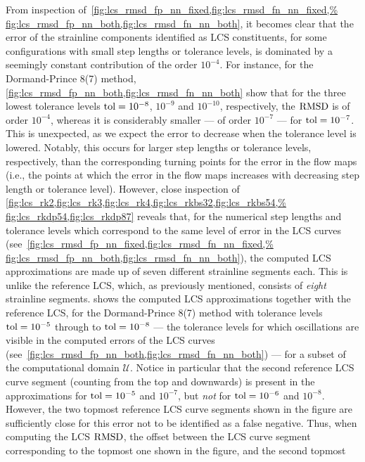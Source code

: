 From inspection of~\cref{fig:lcs_rmsd_fp_nn_fixed,fig:lcs_rmsd_fn_nn_fixed,%
fig:lcs_rmsd_fp_nn_both,fig:lcs_rmsd_fn_nn_both}, it becomes clear that the
error of the strainline components identified as LCS constituents, for some
configurations with small step lengths or tolerance levels, is dominated by
a seemingly constant contribution of the order $10^{-4}$. For instance,
for the Dormand-Prince 8(7) method,
\cref{fig:lcs_rmsd_fp_nn_both,fig:lcs_rmsd_fn_nn_both} show that for the three
lowest tolerance levels $\textnormal{tol}=10^{-8}$, $10^{-9}$ and
$10^{-10}$, respectively, the $\operatorname{RMSD}$ is of order $10^{-4}$, whereas it is
considerably smaller --- of order $10^{-7}$ --- for $\textnormal{tol}=10^{-7}$.
This is unexpected, as we expect the error to decrease when the tolerance level
is lowered.  Notably, this occurs for larger step lengths or tolerance levels,
respectively, than the corresponding turning points for the error in the flow
maps (i.e., the points at which the error in the flow maps increases with
decreasing step length or tolerance level). However, close inspection of
\cref{fig:lcs_rk2,fig:lcs_rk3,fig:lcs_rk4,fig:lcs_rkbs32,fig:lcs_rkbs54,%
fig:lcs_rkdp54,fig:lcs_rkdp87} reveals that, for the numerical step lengths
and tolerance levels which correspond to the same level of error in the LCS
curves (see~\cref{fig:lcs_rmsd_fp_nn_fixed,fig:lcs_rmsd_fn_nn_fixed,%
fig:lcs_rmsd_fp_nn_both,fig:lcs_rmsd_fn_nn_both}), the computed LCS
approximations are made up of seven different strainline segments each. This
is unlike the reference LCS, which, as previously mentioned, consists
of \emph{eight} strainline segments.
\clearpage
{} shows the computed LCS approximations together
with the reference LCS, for the Dormand-Prince 8(7) method with tolerance
levels $\textnormal{tol}=10^{-5}$ through to $\textnormal{tol}=10^{-8}$ ---
the tolerance levels for which oscillations are visible in the computed errors
of the LCS curves (see~\cref{fig:lcs_rmsd_fp_nn_both,fig:lcs_rmsd_fn_nn_both})
--- for a subset of the computational domain $\mathcal{U}$. Notice in
particular that the second reference LCS curve segment (counting from the top
and downwards) is present in the approximations for $\textnormal{tol}=10^{-5}$
and $10^{-7}$, but \emph{not} for $\textnormal{tol}=10^{-6}$ and $10^{-8}$.
However, the two topmost reference LCS curve segments shown in the figure
are sufficiently close for this error not to be identified as a false negative.
Thus, when computing the LCS $\operatorname{RMSD}$, the offset between the LCS curve segment
corresponding to the topmost one shown in the figure, and the second topmost

